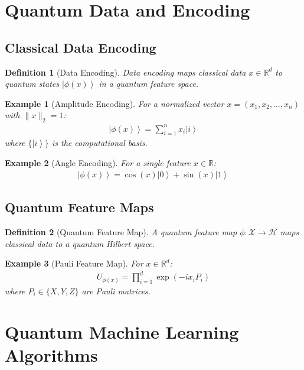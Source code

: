 \documentclass[11pt]{article}
\newtheorem{definition}{Definition}[section]
\newtheorem{example}{Example}[section]
\newcommand{\ket}[1]{\left|#1\right\rangle}
\begin{document}
\section{Quantum Data and Encoding}

\subsection{Classical Data Encoding}

\begin{definition}[Data Encoding]
Data encoding maps classical data $x \in \mathbb{R}^d$ to quantum states $\ket{\phi(x)}$ in a quantum feature space.
\end{definition}

\begin{example}[Amplitude Encoding]
For a normalized vector $x = (x_1, x_2, \ldots, x_n)$ with $\|x\|_2 = 1$:
\begin{align}
\ket{\phi(x)} = \sum_{i=1}^n x_i \ket{i}
\end{align}
where $\{\ket{i}\}$ is the computational basis.
\end{example}

\begin{example}[Angle Encoding]
For a single feature $x \in \mathbb{R}$:
\begin{align}
\ket{\phi(x)} = \cos(x)\ket{0} + \sin(x)\ket{1}
\end{align}
\end{example}

\subsection{Quantum Feature Maps}

\begin{definition}[Quantum Feature Map]
A quantum feature map $\phi: \mathcal{X} \to \mathcal{H}$ maps classical data to a quantum Hilbert space.
\end{definition}

\begin{example}[Pauli Feature Map]
For $x \in \mathbb{R}^d$:
\begin{align}
U_{\phi(x)} = \prod_{i=1}^d \exp(-i x_i P_i)
\end{align}
where $P_i \in \{X, Y, Z\}$ are Pauli matrices.
\end{example}

\section{Quantum Machine Learning Algorithms}
\end{document}
